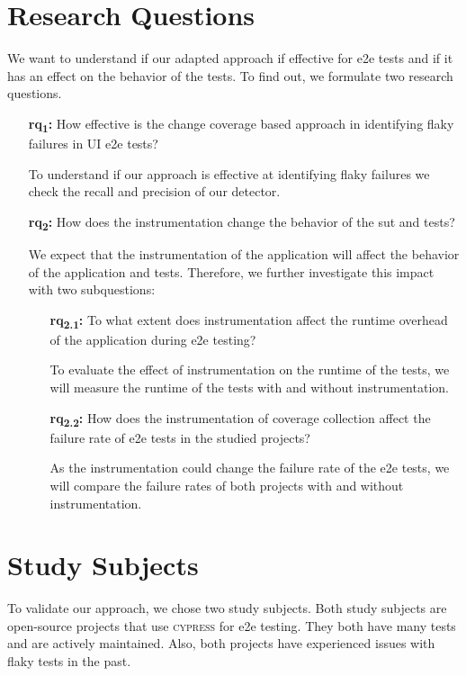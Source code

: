 \section{Research Questions}
We want to understand if our adapted approach if effective for \ac{e2e} tests and if it has an effect on the behavior of the tests.
To find out, we formulate two research questions.
\begin{enumerate}
	\item[\textbf{\acs{rq}\textsubscript{1}:}] How effective is the change coverage based approach in identifying flaky failures in UI \ac{e2e} tests?

		To understand if our approach is effective at identifying flaky failures we check the recall and precision of our detector.
	\item[\textbf{\acs{rq}\textsubscript{2}:}] How does the instrumentation change the behavior of the \ac{sut} and tests?

		We expect that the instrumentation of the application will affect the behavior of the application and tests.
		Therefore, we further investigate this impact with two subquestions:
		\begin{enumerate}
			\item[\textbf{\acs{rq}\textsubscript{2.1}:}] To what extent does instrumentation affect the runtime overhead of the application during \acs{e2e} testing?

				To evaluate the effect of instrumentation on the runtime of the tests, we will measure the runtime of the tests with and without instrumentation.
			\item[\textbf{\acs{rq}\textsubscript{2.2}:}] How does the instrumentation of coverage collection affect the failure rate of \ac{e2e} tests in the studied projects?

				As the instrumentation could change the failure rate of the \ac{e2e} tests, we will compare the failure rates of both projects with and without instrumentation.
		\end{enumerate}
\end{enumerate}

\section{Study Subjects}
To validate our approach, we chose two study subjects.
Both study subjects are open-source projects that use \textsc{cypress} for \ac{e2e} testing.
They both have many tests and are actively maintained.
Also, both projects have experienced issues with flaky tests in the past.

